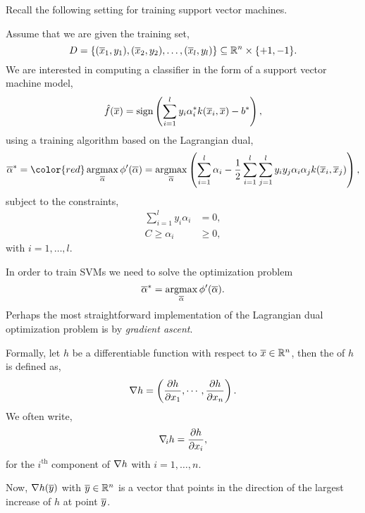\documentclass[a4paper,blends,pdf,colorBG,slideColor]{prosper}
\begin{document}
\small
Recall the following setting for training support vector machines.

Assume that we are given the training set,
\begin{equation*}
D = \{(\overline{x}_1,y_1),(\overline{x}_2,y_2),\ldots,(\overline{x}_l,y_l)\} \subseteq \mathbb{R}^{n}\times\{+1, -1\}.
\end{equation*}
We are interested in computing a classifier in the form of a support vector machine model,
\begin{equation*}
\model{f}(\ol{x}) = \sign \left ( \sum_{i=1}^l y_i \alpha^*_i k(\ol{x}_i,\ol{x}) - b^*\right ),
\end{equation*}
using a training algorithm based on the Lagrangian dual,
\begin{equation*}
\ol{\alpha}^* = {\color{red} \argmax_{\ol{\alpha}} \phi'(\ol{\alpha})} = 
 \argmax_{\ol{\alpha}}  \left (\sum_{i=1}^l \alpha_i - 
  \frac{1}{2}\sum_{i=1}^l\sum_{j=1}^l y_i y_j \alpha_i \alpha_j k(\ol{x}_i,\ol{x}_j) \right ),
\end{equation*}
subject to  the constraints,
\begin{align*}
\sum_{i=1}^l y_i \alpha_i &= 0, \\
C \ge \alpha_i &\ge 0,  
\end{align*}
with $i=1,\ldots,l$.
\es

\small
In order to train SVMs we need to solve the optimization problem
\begin{equation*}
\ol{\alpha}^* = \argmax_{\ol{\alpha}} \phi'(\ol{\alpha}).
\end{equation*}
Perhaps the most straightforward implementation of  the Lagrangian dual optimization problem 
is by {\em gradient ascent}.

Formally, let $h$ be a differentiable function with respect to $\overline{x} \in \mathbb{R}^{n}$, then the
 of $h$ is defined as,
\begin{equation*}
\nabla h = \left (\frac{\partial h}{\partial x_1},\cdots,\frac{\partial h}{\partial x_n}\right ).
\end{equation*}
We often write, 
\begin{equation*}
\nabla_{\! i} h = \frac{\partial h}{\partial x_i},
\end{equation*}
for the $i^\text{th}$ component of $\nabla h$ with $i = 1,\ldots, n$.

Now, $\nabla h(\overline{y})$ with $\overline{y}\in \mathbb{R}^{n}$ is a vector that points in the direction of the largest
increase of $h$ at point $\overline{y}$.
\end{document}
